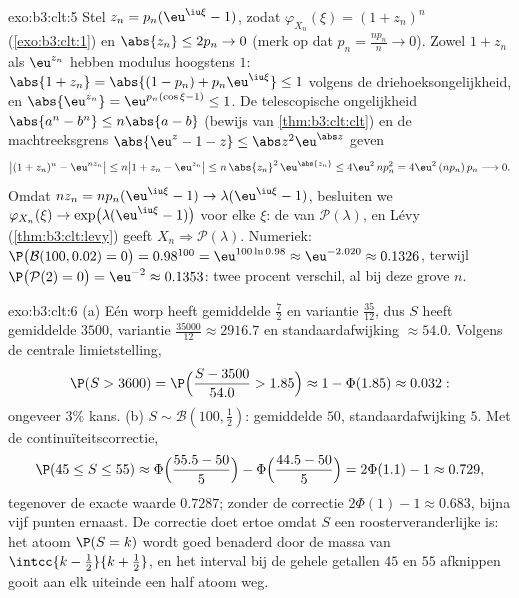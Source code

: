 \begin{solution}{exo:b3:clt:5}
Stel $z_n = p_n(\eu^{\iu\xi} - 1)$, zodat
$\varphi_{X_n}(\xi) = (1 + z_n)^n$ (\cref{exo:b3:clt:1}) en
$\abs{z_n} \leq 2p_n \to 0$ (merk op dat $p_n =
\frac{np_n}n \to 0$). Zowel $1 + z_n$ als $\eu^{z_n}$
hebben modulus hoogstens $1$: $\abs{1 + z_n} = \abs{(1 -
p_n) + p_n\eu^{\iu\xi}} \leq 1$ volgens de
driehoeksongelijkheid, en $\abs{\eu^{z_n}} =
\eu^{p_n(\cos\xi - 1)} \leq 1$. De telescopische
ongelijkheid $\abs{a^n - b^n} \leq n\abs{a - b}$ (bewijs
van \cref{thm:b3:clt:clt}) en de machtreeksgrens
$\abs{\eu^z - 1 - z} \leq \abs z^2\eu^{\abs z}$ geven
\[
\bigl|(1 + z_n)^n - \eu^{nz_n}\bigr| \leq n\bigl|1 + z_n -
\eu^{z_n}\bigr| \leq n\,\abs{z_n}^2\,\eu^{\abs{z_n}} \leq
4\eu^2\,np_n^2 = 4\eu^2\,(np_n)\,p_n \longrightarrow 0 .
\]
Omdat $nz_n = np_n(\eu^{\iu\xi} - 1) \to
\lambda(\eu^{\iu\xi} - 1)$, besluiten we
$\varphi_{X_n}(\xi) \to \exp\bigl(\lambda(\eu^{\iu\xi} -
1)\bigr)$ voor elke $\xi$: de  van
$\mathcal P(\lambda)$, en Lévy
(\cref{thm:b3:clt:levy}) geeft $X_n \Rightarrow \mathcal
P(\lambda)$. Numeriek: $\P\bigl(\mathcal B(100, 0.02) =
0\bigr) = 0.98^{100} = \eu^{100\ln 0.98} \approx
\eu^{-2.020} \approx 0.1326$, terwijl $\P\bigl(\mathcal
P(2) = 0\bigr) = \eu^{-2} \approx 0.1353$: twee procent
verschil, al bij deze grove $n$.
\end{solution}

\begin{solution}{exo:b3:clt:6}
(a) Eén worp heeft gemiddelde $\frac72$ en variantie
$\frac{35}{12}$, dus $S$ heeft gemiddelde $3500$, variantie
$\frac{35000}{12} \approx 2916.7$ en standaardafwijking
$\approx 54.0$. Volgens de centrale limietstelling,
\[
\P(S > 3600) = \P\Bigl(\frac{S - 3500}{54.0} > 1.85\Bigr)
\approx 1 - \Phi(1.85) \approx 0.032 :
\]
ongeveer $3\%$ kans.
(b) $S \sim \mathcal B(100, \frac12)$: gemiddelde $50$,
standaardafwijking $5$. Met de continuïteitscorrectie,
\[
\P(45 \leq S \leq 55) \approx
\Phi\Bigl(\frac{55.5 - 50}{5}\Bigr) -
\Phi\Bigl(\frac{44.5 - 50}{5}\Bigr) = 2\Phi(1.1) - 1
\approx 0.729,
\]
tegenover de exacte waarde $0.7287$; zonder de correctie
$2\Phi(1) - 1 \approx 0.683$, bijna vijf punten ernaast. De
correctie doet ertoe omdat $S$ een roosterveranderlijke is:
het atoom $\P(S = k)$ wordt goed benaderd door de
 massa van $\intcc{k - \frac12}{k + \frac12}$, en
het interval bij de gehele getallen $45$ en $55$ afknippen
gooit aan elk uiteinde een half atoom weg.
\end{solution}

